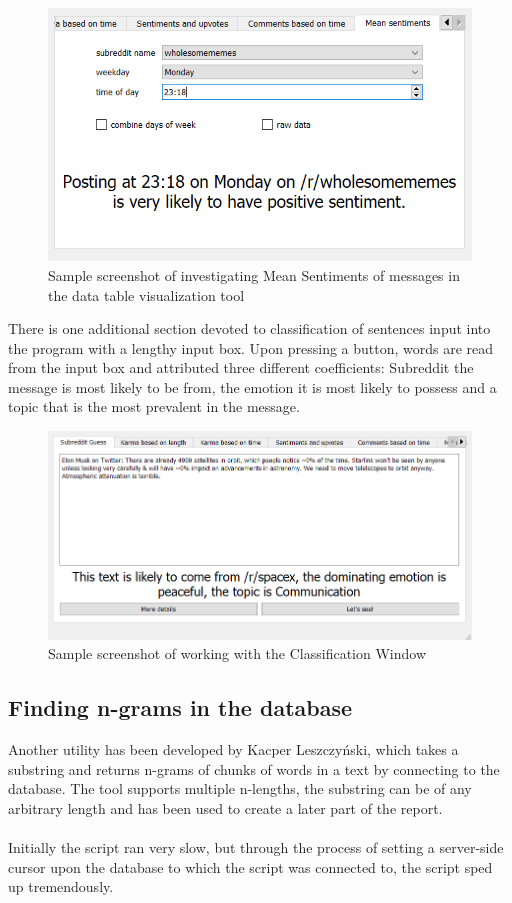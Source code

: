 \documentclass[openany]{article}
\begin{document}
\begin{figure}[H]
    \centering
    \includegraphics[width=\textwidth]{Data_Table_Interaction.png}
    \caption{Sample screenshot of investigating Mean Sentiments of messages in the data table visualization tool}
    \label{fig:mesh1}
\end{figure}

There is one additional section devoted to classification of sentences input into the program with a lengthy input box. Upon pressing a button, words are read from the input box and attributed three different coefficients: Subreddit the message is most likely to be from, the emotion it is most likely to possess and a topic that is the most prevalent in the message.

\begin{figure}[H]
    \centering
    \includegraphics[width=\textwidth]{Classifier_Interaction.png}
    \caption{Sample screenshot of working with the Classification Window}
    \label{fig:mesh1}
\end{figure}

\subsection{Finding n-grams in the database}
Another utility has been developed by Kacper Leszczyński, which takes a substring and returns n-grams of chunks of words in a text by connecting to the database. The tool supports multiple n-lengths, the substring can be of any arbitrary length and has been used to create a later part of the report.\\ \\
Initially the script ran very slow, but through the process of setting a server-side cursor upon the database to which the script was connected to, the script sped up tremendously.
\end{document}
